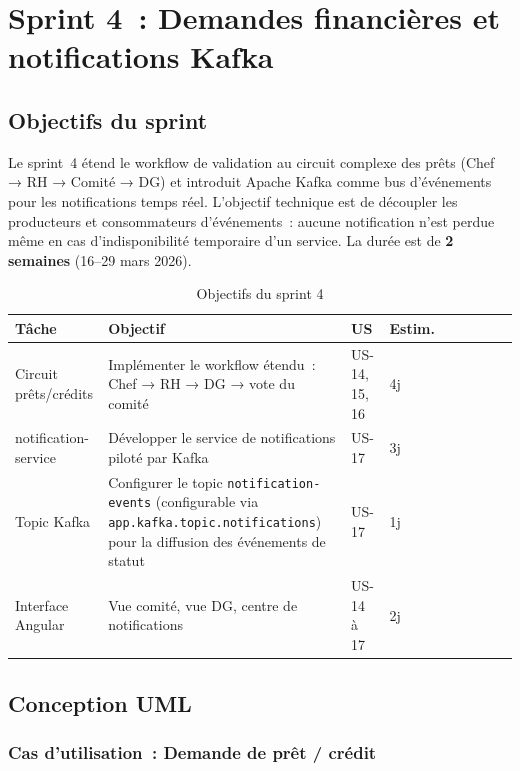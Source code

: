 \section{Sprint 4~: Demandes financières et notifications Kafka}

\subsection{Objectifs du sprint}

Le sprint~4 étend le workflow de validation au circuit complexe des prêts
(Chef → RH → Comité → DG) et introduit Apache Kafka comme bus d'événements
pour les notifications temps réel. L'objectif technique est de découpler les
producteurs et consommateurs d'événements~: aucune notification n'est perdue
même en cas d'indisponibilité temporaire d'un service. La durée est de
\textbf{2 semaines} (16--29 mars 2026).

\begin{table}[H]
\centering
\caption{Objectifs du sprint 4}
\label{tab:sprint4_obj}
\begin{tabularx}{\textwidth}{VlVLVlVlV}
\hline
\textbf{Tâche} & \textbf{Objectif} & \textbf{US} & \textbf{Estim.} \\
\hline
Circuit prêts/crédits & Implémenter le workflow étendu~: Chef → RH → DG → vote du comité & US-14, 15, 16 & 4j \\
\hline
notification-service & Développer le service de notifications piloté par Kafka & US-17 & 3j \\
\hline
Topic Kafka & Configurer le topic \texttt{notification-events} (configurable via \texttt{app.kafka.topic.notifications}) pour la diffusion des événements de statut & US-17 & 1j \\
\hline
Interface Angular & Vue comité, vue DG, centre de notifications & US-14 à 17 & 2j \\
\hline
\end{tabularx}
\end{table}

\subsection{Conception UML}

\subsubsection*{Cas d’utilisation~: Demande de prêt / crédit}

